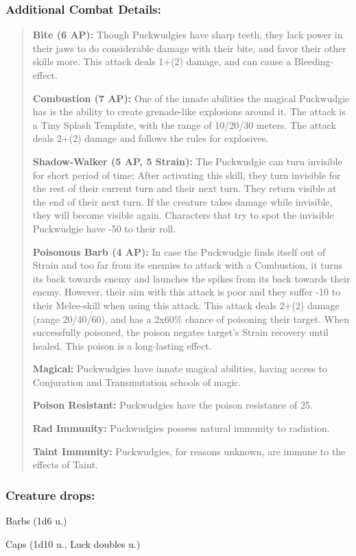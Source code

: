 \documentclass[11pt,a4paper,twocolumn]{book}
\begin{document}
	\subsubsection*{Additional Combat Details:}
	\begin{verse}
		\textbf{Bite (6 AP):} Though Puckwudgies have sharp teeth, they lack power in their jaws to do considerable damage with their bite, and favor their other skills more. This attack deals 1+(2) damage, and can cause a Bleeding-effect.
		
		\textbf{Combustion (7 AP):} One of the innate abilities the magical Puckwudgie has is the ability to create grenade-like explosions around it. The attack is a Tiny Splash Template, with the range of 10/20/30 meters. The attack deals 2+(2) damage and follows the rules for explosives.
		
		\textbf{Shadow-Walker (5 AP, 5 Strain):} The Puckwudgie can turn invisible for short period of time; After activating this skill, they turn invisible for the rest of their current turn and their next turn. They return visible at the end of their next turn. If the creature takes damage while invisible, they will become visible again. Characters that try to spot the invisible Puckwudgie have -50 to their roll.
		
		\textbf{Poisonous Barb (4 AP):} In case the Puckwudgie finds itself out of Strain and too far from its enemies to attack with a Combustion, it turns its back towards enemy and launches the spikes from its back towards their enemy. However, their aim with this attack is poor and they suffer -10 to their Melee-skill when using this attack. This attack deals 2+(2) damage (range 20/40/60), and has a 2x60\% chance of poisoning their target. When successfully poisoned, the poison negates target's Strain recovery until healed. This poison is a long-lasting effect. 
		
		\textbf{Magical:} Puckwudgies have innate magical abilities, having access to Conjuration and Transmutation schools of magic. 
		
		\textbf{Poison Resistant:} Puckwudgies have the poison resistance of 25.
		
		\textbf{Rad Immunity:} Puckwudgies possess natural immunity to radiation.
		
		\textbf{Taint Immunity:} Puckwudgies, for reasons unknown, are immune to the effects of Taint.
	\end{verse}
	
	\subsubsection*{Creature drops:}
	\begin{compactitem}
		\item Barbs (1d6 u.)
		\item Caps (1d10 u., Luck doubles u.)
	\end{compactitem}
	
\end{document}
